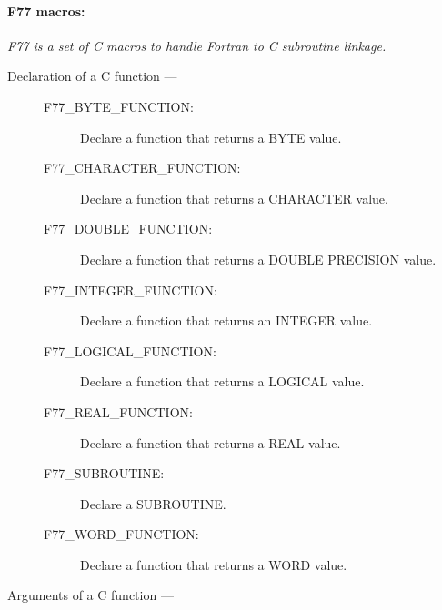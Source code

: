 \newpage

\paragraph{F77 macros:}\hfill

{\em F77 is a set of C macros to handle Fortran to C subroutine linkage.}

\begin{description}

\item [Declaration of a C function ---]

\begin{description}
\item [F77\_BYTE\_FUNCTION:]  Declare a function that returns a BYTE value.
\item [F77\_CHARACTER\_FUNCTION:]  Declare a function that returns a CHARACTER value.
\item [F77\_DOUBLE\_FUNCTION:]  Declare a function that returns a DOUBLE PRECISION value.
\item [F77\_INTEGER\_FUNCTION:]  Declare a function that returns an INTEGER value.
\item [F77\_LOGICAL\_FUNCTION:]  Declare a function that returns a LOGICAL value.
\item [F77\_REAL\_FUNCTION:]  Declare a function that returns a REAL value.
\item [F77\_SUBROUTINE:]  Declare a SUBROUTINE.
\item [F77\_WORD\_FUNCTION:]  Declare a function that returns a WORD value.
\end{description}

\item [Arguments of a C function ---]


\end{description}
